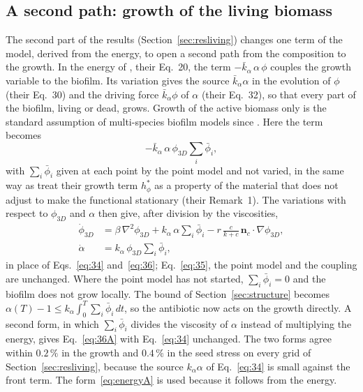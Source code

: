 \documentclass[11pt,a4paper]{article}
\newcommand{\phiD}{\phi_{3D}}
\newcommand{\lv}{\textstyle\sum_i\bar\phi_i}
\newcommand{\nc}{\mathbf n_c}
\begin{document}
\subsection{A second path: growth of the living biomass}
\label{sec:livinggrowth}

The second part of the results (Section~\ref{sec:resliving}) changes one term of the model, derived from the energy, to open a second path from the composition to the growth. In the energy of \citet{Klempt2024DiffusionDrivenGrowth}, their Eq.~20, the term $-\bar k_\alpha\,\alpha\,\phi$ couples the growth variable to the biofilm. Its variation gives the source $\bar k_\alpha\alpha$ in the evolution of $\phi$ (their Eq.~30) and the driving force $\bar k_\alpha\phi$ of $\alpha$ (their Eq.~32), so that every part of the biofilm, living or dead, grows. Growth of the active biomass only is the standard assumption of multi-species biofilm models since \citet{WannerGujer1986}. Here the term becomes
\begin{equation}
-\bar k_\alpha\,\alpha\,\phiD\textstyle\sum_i\bar\phi_i,
\label{eq:energyA}
\end{equation}
with $\lv$ given at each point by the point model and not varied, in the same way as \citet{Klempt2024DiffusionDrivenGrowth} treat their growth term $h^*_\phi$ as a property of the material that does not adjust to make the functional stationary (their Remark~1). The variations with respect to $\phiD$ and $\alpha$ then give, after division by the viscosities,
\begin{align}
\dot\phiD &= \beta\,\nabla^2\phiD + k_\alpha\,\alpha\textstyle\sum_i\bar\phi_i - r\,\frac{c}{k+c}\,\nc\cdot\nabla\phiD, \label{eq:34A}\\
\dot\alpha &= k_\alpha\,\phiD\textstyle\sum_i\bar\phi_i, \label{eq:36A}
\end{align}
in place of Eqs.~\eqref{eq:34} and~\eqref{eq:36}; Eq.~\eqref{eq:35}, the point model and the coupling are unchanged. Where the point model has not started, $\lv=0$ and the biofilm does not grow locally. The bound of Section~\ref{sec:structure} becomes $\alpha(T)-1\le k_\alpha\int_0^T\lv\,dt$, so the antibiotic now acts on the growth directly. A second form, in which $\lv$ divides the viscosity of $\alpha$ instead of multiplying the energy, gives Eq.~\eqref{eq:36A} with Eq.~\eqref{eq:34} unchanged. The two forms agree within $0.2\,\%$ in the growth and $0.4\,\%$ in the seed stress on every grid of Section~\ref{sec:resliving}, because the source $k_\alpha\alpha$ of Eq.~\eqref{eq:34} is small against the front term. The form~\eqref{eq:energyA} is used because it follows from the energy.
\end{document}
